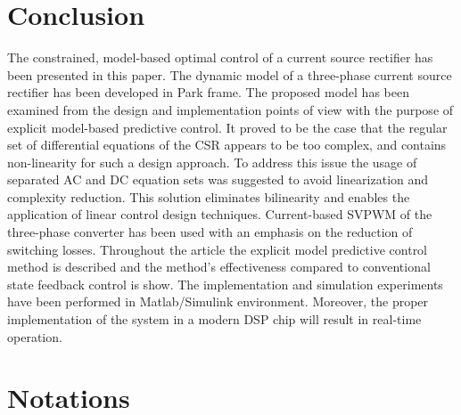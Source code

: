 \section{Conclusion}\label{EMPC:sec:Conclusions}

    The constrained, model-based optimal control of a current source rectifier has been presented in this paper. The dynamic model of a three-phase current source rectifier has been developed in Park frame. The proposed model has been examined from the design and implementation points of view with the purpose of explicit model-based predictive control. It proved to be the case that the regular set of differential equations of the CSR appears to be too complex, and contains non-linearity for such a design approach. To address this issue the usage of separated AC and DC equation sets was suggested to avoid linearization and complexity reduction. This solution eliminates bilinearity and enables the application of linear control design techniques. Current-based SVPWM of the three-phase converter has been used with an emphasis on the reduction of switching losses. Throughout the article the explicit model predictive control method is described and the method's effectiveness compared to conventional state feedback control is show. The implementation and simulation experiments have been performed in Matlab/Simulink environment. Moreover, the proper implementation of the system in a modern DSP chip will result in real-time operation.
		
		\section{Notations}
		
